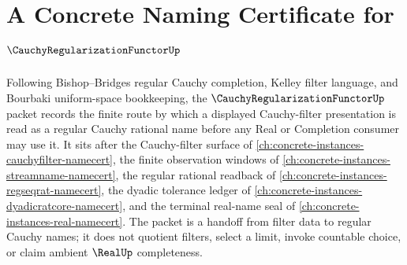 \chapter{A Concrete Naming Certificate for $\CauchyRegularizationFunctorUp$}
\label{ch:concrete-instances-cauchy-regularization-functor-namecert}

Following Bishop--Bridges regular Cauchy completion, Kelley filter language, and Bourbaki uniform-space bookkeeping, the $\CauchyRegularizationFunctorUp$ packet records the finite route by which a displayed Cauchy-filter presentation is read as a regular Cauchy rational name before any Real or Completion consumer may use it. It sits after the Cauchy-filter surface of \autoref{ch:concrete-instances-cauchyfilter-namecert}, the finite observation windows of \autoref{ch:concrete-instances-streamname-namecert}, the regular rational readback of \autoref{ch:concrete-instances-regseqrat-namecert}, the dyadic tolerance ledger of \autoref{ch:concrete-instances-dyadicratcore-namecert}, and the terminal real-name seal of \autoref{ch:concrete-instances-real-namecert}. The packet is a handoff from filter data to regular Cauchy names; it does not quotient filters, select a limit, invoke countable choice, or claim ambient $\RealUp$ completeness.

